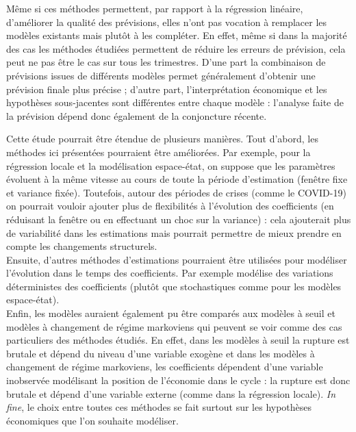 \documentclass[
  a4paper,
  DIV=11,
  numbers=noendperiod,
  french]{scrartcl}
\newcommand\1{{\mathds 1}}
\theoremstyle{remark}
\begin{document}
Même si ces méthodes permettent, par rapport à la régression linéaire,
d'améliorer la qualité des prévisions, elles n'ont pas vocation à
remplacer les modèles existants mais plutôt à les compléter. En effet,
même si dans la majorité des cas les méthodes étudiées permettent de
réduire les erreurs de prévision, cela peut ne pas être le cas sur tous
les trimestres. D'une part la combinaison de prévisions issues de
différents modèles permet généralement d'obtenir une prévision finale
plus précise \autocite[voir par exemple][ pour une revue de
littérature]{WANG20231518} ; d'autre part, l'interprétation économique
et les hypothèses sous-jacentes sont différentes entre chaque modèle :
l'analyse faite de la prévision dépend donc également de la conjoncture
récente.

Cette étude pourrait être étendue de plusieurs manières. Tout d'abord,
les méthodes ici présentées pourraient être améliorées. Par exemple,
pour la régression locale et la modélisation espace-état, on suppose que
les paramètres évoluent à la même vitesse au cours de toute la période
d'estimation (fenêtre fixe et variance fixée). Toutefois, autour des
périodes de crises (comme le COVID-19) on pourrait vouloir ajouter plus
de flexibilités à l'évolution des coefficients (en réduisant la fenêtre
ou en effectuant un choc sur la variance) : cela ajouterait plus de
variabilité dans les estimations mais pourrait permettre de mieux
prendre en compte les changements structurels.\\
Ensuite, d'autres méthodes d'estimations pourraient être utilisées pour
modéliser l'évolution dans le temps des coefficients. Par exemple
\textcite{melard} modélise des variations déterministes des coefficients
(plutôt que stochastiques comme pour les modèles espace-état).\\
Enfin, les modèles auraient également pu être comparés aux modèles à
seuil et modèles à changement de régime markoviens \autocite[voir par
exemple][ pour une revue bibliographique de ces
modèles]{PETROPOULOS2022705} qui peuvent se voir comme des cas
particuliers des méthodes étudiés. En effet, dans les modèles à seuil la
rupture est brutale et dépend du niveau d'une variable exogène et dans
les modèles à changement de régime markoviens, les coefficients
dépendent d'une variable inobservée modélisant la position de l'économie
dans le cycle : la rupture est donc brutale et dépend d'une variable
externe (comme dans la régression locale). \emph{In fine}, le choix
entre toutes ces méthodes se fait surtout sur les hypothèses économiques
que l'on souhaite modéliser.
\end{document}
